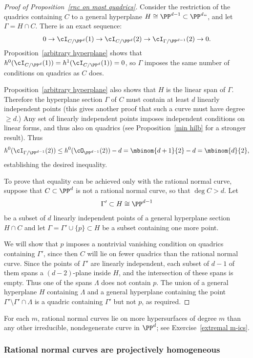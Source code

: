 \begin{proof}[Proof of Proposition~\ref{rnc on most quadrics}]
Consider the restriction of the quadrics containing $C$ to a general hyperplane $H \cong \PP^{d-1} \subset \PP^d` `$, and let $\Gamma = H \cap C$. There is an exact sequence:
$$
0 \to \cI_{C/\PP^d}(1) \to \cI_{C/\PP^d}(2) \to \cI_{\Gamma/\PP^{d-1}}(2) \to 0.
$$
Proposition~\ref{arbitrary hyperplane} shows that $h^0(\cI_{C/\PP^d}(1)) = h^1(\cI_{C/\PP^d}(1))=0$, so $\Gamma$
imposes the same number of conditions on quadrics as $C$ does.

Proposition~\ref{arbitrary hyperplane} also shows that $H$ is the
\vadjust{\allowbreak}%
linear span of  $\Gamma$.
Therefore
the hyperplane section $\Gamma$ of $C$ must contain at least $d$
linearly independent points (this gives another proof that
such a curve must have degree $\geq d$.)
Any set of linearly independent points imposes independent conditions on linear forms, and thus also on quadrics (see
Proposition~\ref{min hilb} for a stronger result).
Thus
$$
h^0(\cI_{\Gamma/\PP^{d-1}}(2)) \leq h^0(\cO_{\PP^{d-1}}(2)) - d =
\mbinom{d+1}{2} - d = \mbinom{d}{2},
$$
establishing the desired inequality.

To prove that
equality can be achieved only with the rational normal curve,
suppose that $C\subset \PP^{d}$
is not a rational normal curve, so that $\deg C >d$. Let
$$
\Gamma' \subset H \cong \PP^{d-1}
$$
be a subset
of $d$ linearly independent points of a general hyperplane section $H\cap C$
and let $\Gamma = \Gamma'\cup\{p\}\subset H$ be a subset containing one more point.

We will
show that $p$ imposes a nontrivial vanishing condition on quadrics containing $\Gamma'$, since
then $C$
will lie
on fewer quadrics than the rational normal curve.
Since the points of $\Gamma'$ are linearly independent, each subset of
$d{-}1$ of them spans a $(d{-}2)$-plane inside $H$, and the intersection
of these spans is empty. Thus one of the spans $\Lambda$ does not
contain $p$.
The union of  a general hyperplane $H$ containing $\Lambda$ and a general hyperplane containing
the point $\Gamma' \setminus \Gamma'\cap \Lambda$
is a quadric containing $\Gamma'$ but not $p$, as required.
\unif
\end{proof}

For each $m$, rational normal curves lie on more hypersurfaces of
degree $m$ than any other irreducible, nondegenerate curve in $\PP^d$;
see Exercise~\ref{extremal m-ics}.

\subsubsection*{Rational normal curves are projectively homogeneous}

